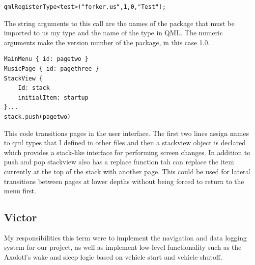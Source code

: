 \documentclass[onecolumn, draftclsnofoot,10pt, compsoc]{IEEEtran}
\begin{document}
\begin{verbatim}
qmlRegisterType<test>("forker.us",1,0,"Test");
\end{verbatim}

The string arguments to this call are the names of the package that must be imported to us my type and the name of the type in QML. The numeric arguments make the version number of the package, in this case 1.0.

\begin{verbatim}
MainMenu { id: pagetwo }
MusicPage { id: pagethree }
StackView {
	Id: stack
	initialItem: startup
}...
stack.push(pagetwo)
\end{verbatim}
This code transitions pages in the user interface. The first two lines assign names to qml types that I defined in other files and then a stackview object is declared which provides a stack-like interface for performing screen changes. In addition to push and pop stackview also has a replace function tah can replace the item currently at the top of the stack with another page. This could be used for lateral transitions between pages at lower depths without being forced to return to the menu first.

\newpage
\subsection{Victor}
My responsibilities this term were to implement the navigation and data logging system for our project, as well as implement low-level functionality such as the Axolotl's wake and sleep logic based on vehicle start and vehicle shutoff.\par
\end{document}
